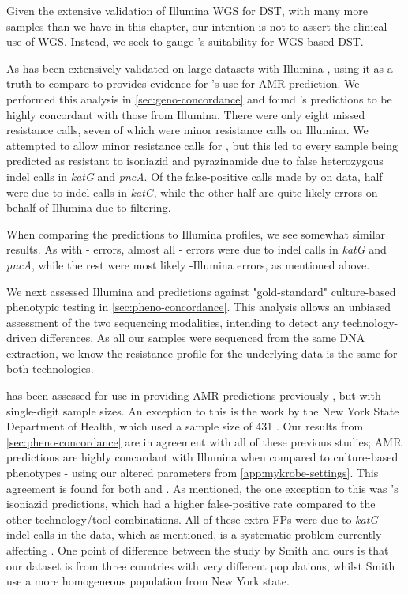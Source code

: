 \hspace{0.75cm}

\noindent
Given the extensive validation of Illumina WGS for DST, with many more samples than we have in this chapter, our intention is not to assert the clinical use of WGS. Instead, we seek to gauge \ont{}'s suitability for WGS-based DST. 

As \mykrobe{} has been extensively validated on large datasets with Illumina \cite{bradley2015,hunt2019}, using it as a truth to compare \ont{} to provides evidence for \ont{}'s use for AMR prediction. We performed this analysis in \autoref{sec:geno-concordance} and found \mykrobe{}'s \ont{} predictions to be highly concordant with those from Illumina. There were only eight missed resistance calls, seven of which were minor resistance calls on Illumina. We attempted to allow minor resistance calls for \ont{}, but this led to every sample being predicted as resistant to isoniazid and pyrazinamide due to false heterozygous indel calls in \textit{katG} and \textit{pncA}. Of the false-positive calls made by \mykrobe{} on \ont{} data, half were due to indel calls in \textit{katG}, while the other half are quite likely errors on behalf of Illumina due to filtering.

When comparing the \drprg{} predictions to \mykrobe{} Illumina profiles, we see somewhat similar results. As with \mykrobe{}-\ont{} errors, almost all \drprg{}-\ont{} errors were due to indel calls in \textit{katG} and \textit{pncA}, while the rest were most likely \mykrobe{}-Illumina errors, as mentioned above. 

\noindent
We next assessed Illumina and \ont{} predictions against "gold-standard" culture-based phenotypic testing in \autoref{sec:pheno-concordance}. This analysis allows an unbiased assessment of the two sequencing modalities, intending to detect any technology-driven differences. As all our samples were sequenced from the same DNA extraction, we know the resistance profile for the underlying data is the same for both technologies. 

\ont{} has been assessed for use in providing AMR predictions previously \cite{bradley2015,hunt2019,phelan2019}, but with single-digit sample sizes. An exception to this is the work by the New York State Department of Health, which used a sample size of 431 \cite{smith2020}. Our results from \autoref{sec:pheno-concordance} are in agreement with all of these previous studies; \ont{} AMR predictions are highly concordant with Illumina when compared to culture-based phenotypes - using our altered parameters from \autoref{app:mykrobe-settings}. This agreement is found for both \mykrobe{} and \drprg{}. As mentioned, the one exception to this was \mykrobe{}'s \ont{} isoniazid predictions, which had a higher false-positive rate compared to the other technology/tool combinations. All of these extra FPs were due to \textit{katG} indel calls in the \ont{} data, which as mentioned, is a systematic problem currently affecting \ont{} \cite{watson2019}. One point of difference between the \ont{} study by Smith \etal{} and ours is that our dataset is from three countries with very different \mtb{} populations, whilst Smith \etal{} use a more homogeneous population from New York state. 

